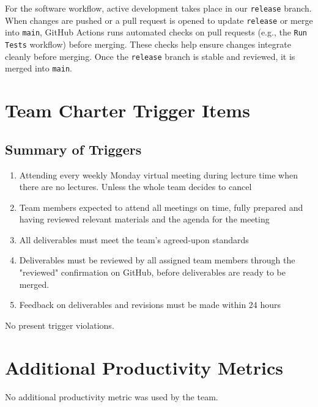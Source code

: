 \documentclass{article}
\begin{document}
For the software workflow, active development takes place
in our \texttt{release} branch. When changes are pushed or
a pull request is opened to update \texttt{release} or merge
into \texttt{main}, GitHub Actions runs automated checks on pull requests
(e.g., the \texttt{Run Tests} workflow) before merging. These checks help ensure changes
integrate cleanly before merging. Once the \texttt{release}
branch is stable and reviewed, it is merged into \texttt{main}.
\section{Team Charter Trigger Items}

\subsection{Summary of Triggers}
\begin{enumerate}
\item{Attending every weekly Monday virtual meeting during lecture time when there are no lectures. Unless the whole team decides to cancel}
\item{Team members expected to attend all meetings on time, fully prepared and having reviewed relevant materials and the agenda for the meeting}
\item{All deliverables must meet the team's agreed-upon standards}
\item{Deliverables must be reviewed by all assigned team members through the "reviewed" confirmation on GitHub, before deliverables are ready to be merged.}
\item{Feedback on deliverables and revisions must be made within 24 hours}
\end{enumerate}

No present trigger violations.

\section{Additional Productivity Metrics}
No additional productivity metric was used by the team.
\end{document}
